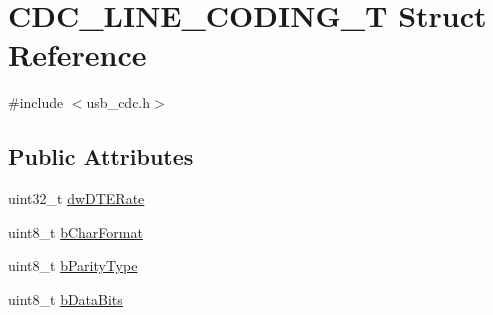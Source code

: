 \hypertarget{struct_c_d_c___l_i_n_e___c_o_d_i_n_g___t}{\section{C\-D\-C\-\_\-\-L\-I\-N\-E\-\_\-\-C\-O\-D\-I\-N\-G\-\_\-\-T Struct Reference}
\label{struct_c_d_c___l_i_n_e___c_o_d_i_n_g___t}
}


{\ttfamily \#include $<$usb\-\_\-cdc.\-h$>$}

\subsection*{Public Attributes}
\begin{DoxyCompactItemize}
\item 
uint32\-\_\-t \hyperlink{struct_c_d_c___l_i_n_e___c_o_d_i_n_g___t_a961e9e249660059662c4923097b2ff0b}{dw\-D\-T\-E\-Rate}
\item 
uint8\-\_\-t \hyperlink{struct_c_d_c___l_i_n_e___c_o_d_i_n_g___t_a17e098c91cf3d50180ea21d0761c01c3}{b\-Char\-Format}
\item 
uint8\-\_\-t \hyperlink{struct_c_d_c___l_i_n_e___c_o_d_i_n_g___t_aea6bb5c8e894aaf54b0d224345cade83}{b\-Parity\-Type}
\item 
uint8\-\_\-t \hyperlink{struct_c_d_c___l_i_n_e___c_o_d_i_n_g___t_a1112ce2bc89d118029c82288a6fbf540}{b\-Data\-Bits}
\end{DoxyCompactItemize}


